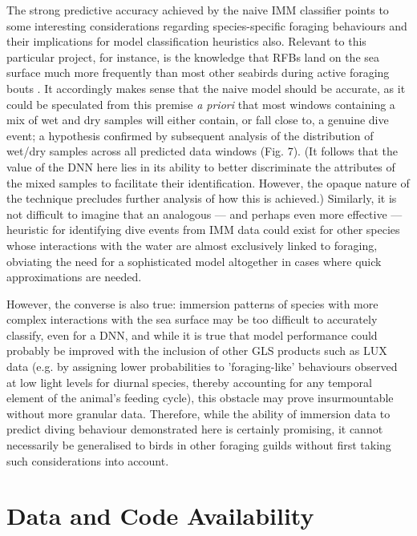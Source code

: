 \documentclass[11pt]{article}
\begin{document}
    The strong predictive accuracy achieved by the naive IMM classifier points to some interesting considerations regarding species-specific foraging behaviours and their implications for model classification heuristics also. Relevant to this particular project, for instance, is the knowledge that RFBs land on the sea surface much more frequently than most other seabirds during active foraging bouts \citep{weimerskirch2005three}. It accordingly makes sense that the naive model should be accurate, as it could be speculated from this premise \emph{a priori} that most windows containing a mix of wet and dry samples will either contain, or fall close to, a genuine dive event; a hypothesis confirmed by subsequent analysis of the distribution of wet/dry samples across all predicted data windows (Fig. 7). (It follows that the value of the DNN here lies in its ability to better discriminate the attributes of the mixed samples to facilitate their identification. However, the opaque nature of the technique precludes further analysis of how this is achieved.) Similarly, it is not difficult to imagine that an analogous — and perhaps even more effective — heuristic for identifying dive events from IMM data could exist for other species whose interactions with the water are almost exclusively linked to foraging, obviating the need for a sophisticated model altogether in cases where quick approximations are needed. 
    
    However, the converse is also true: immersion patterns of species with more complex interactions with the sea surface may be too difficult to accurately classify, even for a DNN, and while it is true that model performance could probably be improved with the inclusion of other GLS products such as LUX data (e.g. by assigning lower probabilities to 'foraging-like' behaviours observed at low light levels for diurnal species, thereby accounting for any temporal element of the animal's feeding cycle), this obstacle may prove insurmountable without more granular data. Therefore, while the ability of immersion data to predict diving behaviour demonstrated here is certainly promising, it cannot necessarily be generalised to birds in other foraging guilds without first taking such considerations into account.
    
    
    \newpage
    \nolinenumbers
    \section*{Data and Code Availability}
    
\end{document}

